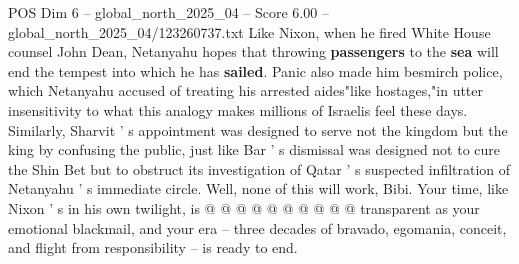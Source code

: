 \begin{textsample}{POS Dim 6 – global\_north\_2025\_04 – Score 6.00 – global\_north\_2025\_04/123260737.txt}
Like Nixon, when he fired White House counsel John Dean, Netanyahu hopes that throwing \textbf{passengers} to the \textbf{sea} will end the tempest into which he has \textbf{sailed}.
Panic also made him besmirch police, which Netanyahu accused of treating his arrested aides"like hostages,"in utter insensitivity to what this analogy makes millions of Israelis feel these days.
Similarly, Sharvit ' s appointment was designed to serve not the kingdom but the king by confusing the public, just like Bar ' s dismissal was designed not to cure the Shin Bet but to obstruct its investigation of Qatar ' s suspected infiltration of Netanyahu ' s immediate circle.
Well, none of this will work, Bibi.
Your time, like Nixon ' s in his own twilight, is @ @ @ @ @ @ @ @ @ @ transparent as your emotional blackmail, and your era -- three decades of bravado, egomania, conceit, and flight from responsibility -- is ready to end.

\end{textsample}
